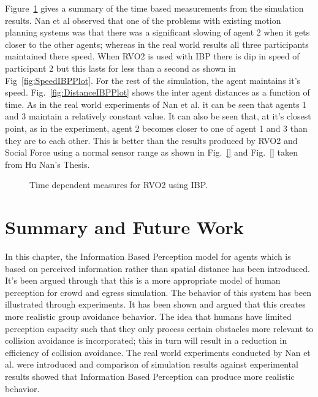 Figure~\ref{fig:TimeBasedMeasurements} gives a summary of the time based measurements from the simulation results. Nan et al observed that one of the problems with existing motion planning systems was that there was a significant slowing of agent 2 when it gets closer to the other agents; whereas in the real world results all three participants maintained there speed. When RVO2 is used with IBP there is dip in speed of participant 2 but this lasts for less than a second as shown in Fig~\ref{fig:SpeedIBPPlot}. For the rest of the simulation, the agent maintains it's speed. Fig.~\ref{fig:DistanceIBPPlot} shows the inter agent distances as a function of time. As in the real world experiments of Nan et al. it can be seen that agents 1 and 3 maintain a relatively constant value. It can also be seen that, at it's closest point, as in the experiment, agent 2 becomes closer to one of agent 1 and 3 than they are to each other. This is better than the results produced by RVO2 and Social Force using a normal sensor range as shown in Fig.~\ref{} and Fig.~\ref{} taken from Hu Nan's Thesis.




\begin{figure}[!tb]
  \centering
  \hspace{1pt}
  \caption{Time dependent measures for RVO2 using IBP.}
  \label{fig:TimeBasedMeasurements}
\end{figure}


\section{Summary and Future Work}
\label{IBP:Conclusion}

In this chapter, the Information Based Perception model for agents which is based on perceived information rather than spatial distance has been introduced. It's been argued through that this is a more appropriate model of human perception for crowd and egress simulation. The behavior of this system has been illustrated through experiments. It has been shown and argued that this creates more realistic group avoidance behavior. The idea that humans have limited perception capacity such that they only process certain obstacles more relevant to collision avoidance is incorporated; this in turn will result in a reduction in efficiency of collision avoidance. The real world experiments conducted by Nan et al. were introduced and comparison of simulation results against experimental results showed that Information Based Perception can produce more realistic behavior.



